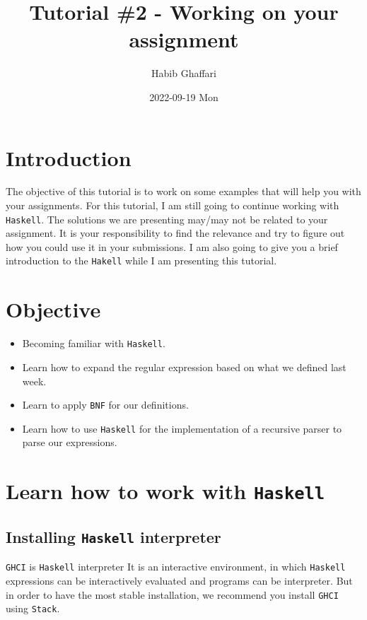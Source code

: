 \documentclass[11pt]{article}
\author{Habib Ghaffari}
\date{2022-09-19 Mon}
\title{Tutorial \#2 - Working on your assignment}
\begin{document}
\maketitle
\tableofcontents



\section{Introduction}
\label{sec:org5ab51d3}

The objective of this tutorial is to work on some examples that will help you
with your assignments. For this tutorial, I am still going to continue working
with \texttt{Haskell}. The solutions we are presenting may/may not be related to your
assignment. It is your responsibility to find the relevance and try to figure out
how you could use it in your submissions. I am also going to give you a brief
introduction to the \texttt{Hakell} while I am presenting this tutorial.


\section{Objective}
\label{sec:org2bf516e}

\begin{itemize}
\item Becoming familiar with \texttt{Haskell}.
\item Learn how to expand the regular expression based on what we defined last
week.
\item Learn to apply \texttt{BNF} for our definitions.
\item Learn how to use \texttt{Haskell} for the implementation of a recursive parser to
parse our expressions.
\end{itemize}


\section{Learn how to work with \texttt{Haskell}}
\label{sec:orga32de30}

\subsection{Installing \texttt{Haskell} interpreter}
\label{sec:orgdef6eb4}

\texttt{GHCI} is \texttt{Haskell} interpreter It is an interactive environment, in which
\texttt{Haskell} expressions can be interactively evaluated and programs can be
interpreter. But in order to have the most stable installation, we recommend
you install \texttt{GHCI} using \texttt{Stack}.
\end{document}
